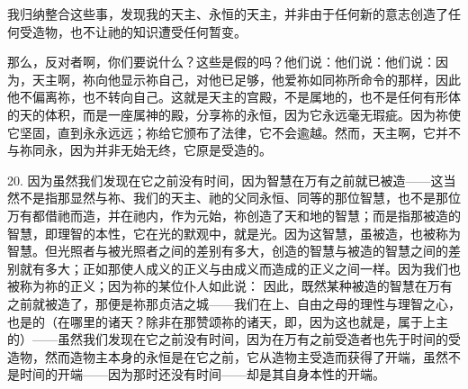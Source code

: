我归纳整合这些事，发现我的天主、永恒的天主，并非由于任何新的意志创造了任何受造物，也不让祂的知识遭受任何暂变。\par

那么，反对者啊，你们要说什么？这些是假的吗？他们说：他们说：他们说：因为，天主啊，祢向他显示祢自己，对他已足够，他爱祢如同祢所命令的那样，因此他不偏离祢，也不转向自己。这就是天主的宫殿，不是属地的，也不是任何有形体的天的体积，而是一座属神的殿，分享祢的永恒，因为它永远毫无瑕疵。因为祢使它坚固，直到永永远远；祢给它颁布了法律，它不会逾越。然而，天主啊，它并不与祢同永，因为并非无始无终，它原是受造的。\par

20. 因为虽然我们发现在它之前没有时间，因为智慧在万有之前就已被造——这当然不是指那显然与祢、我们的天主、祂的父同永恒、同等的那位智慧，也不是那位万有都借祂而造，并在祂内，作为元始，祢创造了天和地的智慧；而是指那被造的智慧，即理智的本性，它在光的默观中，就是光。因为这智慧，虽被造，也被称为智慧。但光照者与被光照者之间的差别有多大，创造的智慧与被造的智慧之间的差别就有多大；正如那使人成义的正义与由成义而造成的正义之间一样。因为我们也被称为祢的正义；因为祢的某位仆人如此说： 因此，既然某种被造的智慧在万有之前就被造了，那便是祢那贞洁之城——我们在上、自由之母的理性与理智之心，也是的（在哪里的诸天？除非在那赞颂祢的诸天，即，因为这也就是，属于上主的）——虽然我们发现在它之前没有时间，因为在万有之前受造者也先于时间的受造物，然而造物主本身的永恒是在它之前，它从造物主受造而获得了开端，虽然不是时间的开端——因为那时还没有时间——却是其自身本性的开端。\par

